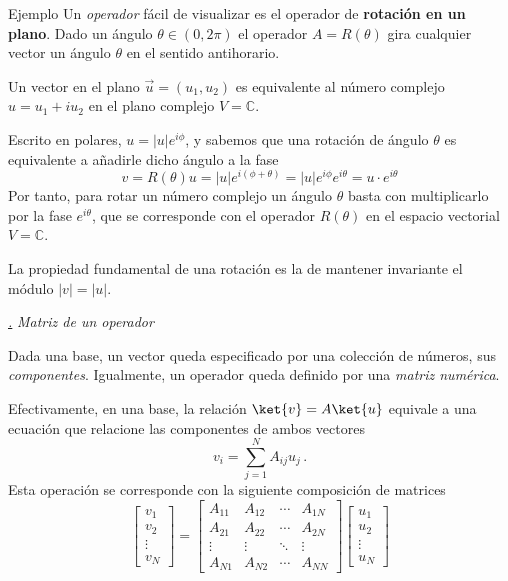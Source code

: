 \documentclass[a4paper,11pt]{book} %
\numberwithin{equation}{chapter}
\def\subsubiContadorIt{\par\addtocounter{subsubsection}{1}\underline{\it\thesubsubsection.}\hskip0.5cm \setcounter{subsubsubsectionIt}{0}}
\newcommand{\SubsubiIt}[1]{
		\subsubiContadorIt \textit{#1}
	}
\newcounter{subsubsubsectionIt}[subsubsection]
\begin{document}
	\begin{mybox_green}{Ejemplo}
	Un \textit{operador}  fácil de visualizar es el operador de \textbf{rotación en un plano}. Dado un ángulo $\theta \in (0,2\pi)$ el operador $A = R(\theta)$ gira cualquier vector un ángulo $\theta$ en el sentido antihorario.
\vspace{0.3cm}

Un vector en el plano ${\vec{u}} =  (u_1,u_2)$  es equivalente al número complejo $u = u_1 + i u_2$ en el plano complejo $V = {\mathbb C}$.
\vspace{0.3cm}

Escrito en polares, $u=|u|e^{i\phi}$, y sabemos que una rotación de ángulo $\theta$ es equivalente a añadirle dicho  ángulo a la fase 
\begin{equation}
 v = R(\theta) u = |u| e^{i(\phi + \theta)} =  |u| e^{i\phi } e^{i\theta} = u\cdot e^{i\theta} 
\end{equation}
Por tanto, para rotar un número complejo un ángulo $\theta$ basta con multiplicarlo por la fase $e^{i\theta}$, que se corresponde con el operador $R(\theta)$ en el espacio vectorial $V = \mathbb{C}$.       
\vspace{0.3cm}
    
La propiedad fundamental de una rotación es la de mantener invariante el módulo  $|v| = |u|$.    
	\end{mybox_green}


			\SubsubiIt{Matriz de un operador}

Dada una base, un vector queda especificado por una colección de números, sus \textit{componentes}. Igualmente, un operador queda definido por una \textit{matriz numérica}.


Efectivamente, en una base, la relación $\ket{v} = A\ket{u}$ equivale a una ecuación que relacione las componentes de ambos vectores
	\begin{equation}
	\boxed{v_i = \sum_{j=1}^N A_{ij} u_j } \, .
	\end{equation}
Esta operación se corresponde con la siguiente composición de matrices
	\begin{equation}
	\boxed{\begin{bmatrix}
v_1 \\ v_2 \\ \vdots \\ v_N \end{bmatrix} =  \begin{bmatrix} 
A_{11} & A_{12} & \cdots & A_{1N} \\
A_{21} & A_{22} & \cdots & A_{2N} \\
\vdots & \vdots &  \ddots      & \vdots \\
A_{N1} & A_{N2} &    \cdots    & A_{NN}
\end{bmatrix}
 \begin{bmatrix} 
u_1 \\ u_2 \\ \vdots \\ u_N\end{bmatrix}}
	\end{equation}
\end{document}
